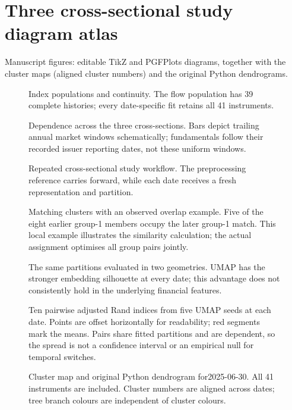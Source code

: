 

\section*{Three cross-sectional study diagram atlas}
Manuscript figures: editable TikZ and PGFPlots diagrams, together with the cluster maps (aligned cluster numbers) and the original Python dendrograms.
\clearpage
\begin{figure}[p]
\centering
{}
\caption{Index populations and continuity. The flow population has 39 complete histories; every date-specific fit retains all 41 instruments.}\end{figure}
\clearpage
\begin{figure}[p]
\centering
{}
\caption{Dependence across the three cross-sections. Bars depict trailing annual market windows schematically; fundamentals follow their recorded issuer reporting dates, not these uniform windows.}\end{figure}
\clearpage
\begin{figure}[p]
\centering
{}
\caption{Repeated cross-sectional study workflow. The preprocessing reference carries forward, while each date receives a fresh representation and partition.}\end{figure}
\clearpage
\begin{figure}[p]
\centering
{}
\caption{Matching clusters with an observed overlap example. Five of the eight earlier group-1 members occupy the later group-1 match. This local example illustrates the similarity calculation; the actual assignment optimises all group pairs jointly.}\end{figure}
\clearpage
\begin{figure}[p]
\centering
{}
\caption{The same partitions evaluated in two geometries. UMAP has the stronger embedding silhouette at every date; this advantage does not consistently hold in the underlying financial features.}\end{figure}
\clearpage
\begin{figure}[p]
\centering
{}
\caption{Ten pairwise adjusted Rand indices from five UMAP seeds at each date. Points are offset horizontally for readability; red segments mark the means. Pairs share fitted partitions and are dependent, so the spread is not a confidence interval or an empirical null for temporal switches.}\end{figure}
\clearpage
\begin{figure}[p]
\centering
{}
\caption{Cluster map and original Python dendrogram for2025-06-30. All 41 instruments are included. Cluster numbers are aligned across dates; tree branch colours are independent of cluster colours.}
\end{figure}
